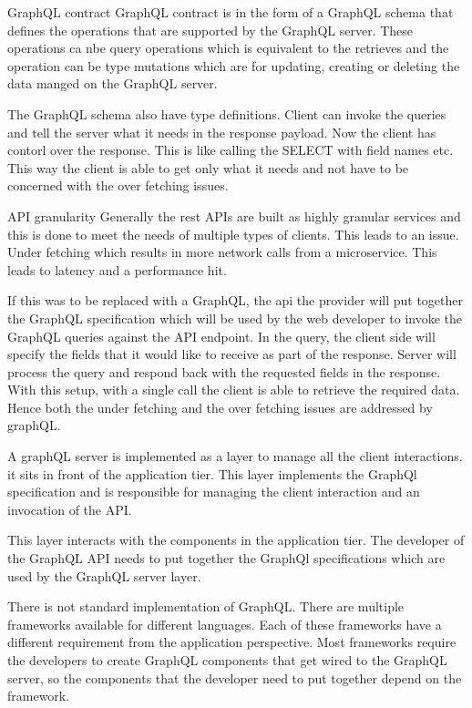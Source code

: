 GraphQL contract
GraphQL contract is in the form of a GraphQL schema that defines the operations that are supported by the GraphQL server.
These operations ca nbe query operations which is equivalent to the retrieves and the operation can be type mutations which are for updating, creating or deleting the data manged on the GraphQL server.

The GraphQL schema also have type definitions.
Client can invoke the queries and tell the server what it needs in the response payload.
Now the client has contorl over the response.
This is like calling the SELECT with field names etc.
This way the client is able to get only what it needs and not have to be concerned with the over fetching issues.

API granularity
Generally the rest APIs are built as highly granular services and this is done to meet the needs of multiple types of clients.
This leads to an issue.
Under fetching which results in more network calls from a microservice. This leads to latency and a performance hit.

If this was to be replaced with a GraphQL, the api the provider will put together the GraphQL specification which will be used by the web developer to invoke the GraphQL queries against the API endpoint.
In the query, the client side will specify the fields that it would like to receive as part of the response.
Server will process the query and respond back with the requested fields in the response.
With this setup, with a single call the client is able to retrieve the required data.
Hence both the under fetching and the over fetching issues are addressed by graphQL.

A graphQL server is implemented as a layer to manage all the client interactions.
it sits in front of the application tier.
This layer implements the GraphQl specification and is responsible  for managing the client interaction and an invocation of the API.

This layer interacts with the components in the application tier.
The developer of the GraphQL API needs to put together the GraphQl specifications which are used by the GraphQL server layer.

There is not standard implementation of GraphQL.
There are multiple frameworks available for different languages.
Each of these frameworks have a different requirement from the application perspective.
Most frameworks require the developers to create GraphQL components that get wired to the GraphQL server, so the components that the developer need to put together depend on the framework.

